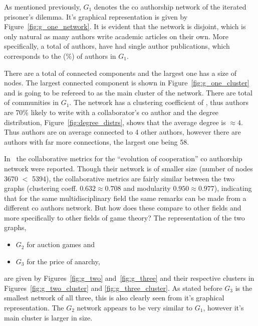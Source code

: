 \documentclass{article}
\theoremstyle{definition}
\newcommand{\isolated}{}
\newcommand{\isolatedpercentage}{}
\newcommand{\connectedcomponents}{}
\newcommand{\communities}{}
\newcommand{\largestcc}{}
\newcommand{\clustering}{}
\begin{document}
As mentioned previously, \(G_1\) denotes the co authorship network of the iterated
prisoner's dilemma. It's graphical representation is given by Figure~\ref{fig:g_one_network}.
It is evident that the network is disjoint, which is only natural as many authors
write academic articles on their own. More specifically, a total of \isolated authors,
have had single author publications, which corresponds to the \isolatedpercentage (\%)
of authors in \(G_1\).

There are a total of \connectedcomponents connected components and the largest one
has a size of \largestcc nodes. The largest connected component is shown in Figure~\ref{fig:g_one_cluster}
and is going to be refereed to as the main cluster of the network.
There are total of \communities communities in \(G_1\). The network has a clustering
coefficient of \clustering,
thus authors are 70\% likely to write with a collaborator's co author and the degree
distribution, Figure~\ref{fig:degree_distrs}, shows that the average degree is \(\approx4\).
Thus authors are on average connected to 4 other authors, however there are authors
with far more connections, the largest one being 58.

In~\cite{Liu2015} the collaborative metrics for the ``evolution of cooperation''
co authorship network were reported. Though their network is of smaller size
(number of nodes 3670 \(<\) 5394), the collaborative metrics are fairly similar
between the two graphs (clustering coeff. \(0.632\approx0.708\) and modularity
\(0.950\approx0.977\)), indicating that for the same multidisciplinary field the same
remarks can be made from a different co authors network. But how does these compare to other fields
and more specifically to other fields of game theory? The representation of the
two graphs,

\begin{itemize}
    \item \(G_2\) for auction games and
    \item \(G_3\) for the price of anarchy,
\end{itemize}

are given by Figures~\ref{fig:g_two} and~\ref{fig:g_three} and their respective
clusters in Figures~\ref{fig:g_two_cluster} and \ref{fig:g_three_cluster}.
As stated before \(G_3\) is the smallest network of all three, this is also clearly
seen from it's graphical representation. The \(G_2\) network  appears to be
very similar to \(G_1\), however it's main cluster is larger in size.
\end{document}
